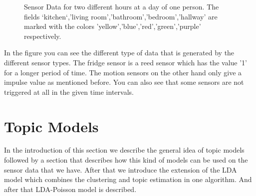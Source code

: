 \documentclass[11pt,a4paper]{article}
\begin{document}
\begin{figure}[h!]
\begin{subfigure}[b]{0.45\textwidth}
  \end{subfigure}
  \caption{Sensor Data for two different hours at a day of one person. The fields `kitchen`,'living room','bathroom','bedroom','hallway' are marked with the colors 'yellow','blue','red','green','purple' respectively.}
  \label{fig:PlaineSensorData}
\end{figure}

In the figure you can see the different type of data that is generated by the different sensor types. The fridge sensor is a reed sensor which has the value '1' for a longer period of time. The motion sensors on the other hand only give a impulse value as mentioned before. You can also see that some sensors are not triggered at all in the given time intervals.



\pagebreak
\section{Topic Models}
\label{sec:TopicModels}
In the introduction of this section we describe the general idea of topic models followed by a section that describes how this kind of models can be used on the sensor data that we have. After that we introduce the extension of the LDA model which combines the clustering and topic estimation in one algorithm. And after that LDA-Poisson model is described.
\end{document}
